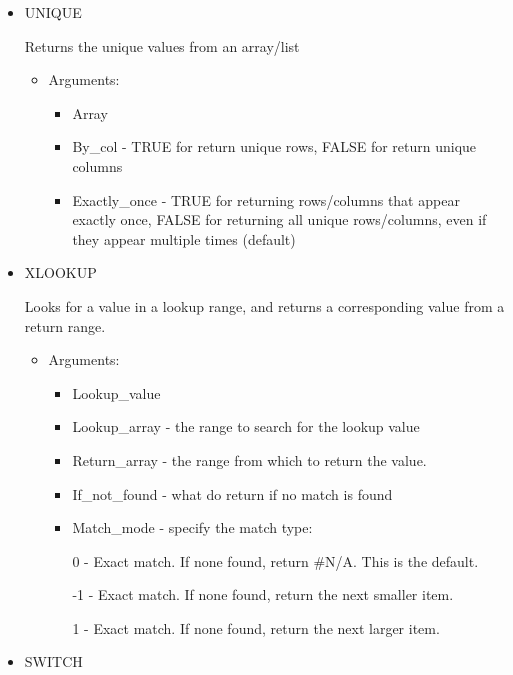 \documentclass[8pt]{extarticle}
\begin{document}
\begin{multicols}{3}
\begin{itemize}
    \item UNIQUE
    
    Returns the unique values from an array/list
    \begin{itemize}
        \item Arguments:
        \begin{itemize}
            \item Array
            \item By\_col - TRUE for return unique rows, FALSE for return unique columns
            \item Exactly\_once - TRUE for returning rows/columns that appear exactly once, FALSE for returning all unique rows/columns, even if they appear multiple times (default)
        \end{itemize}
    \end{itemize}
\end{itemize}

\columnbreak
\begin{itemize}
    \item XLOOKUP
    
    Looks for a value in a lookup range, and returns a corresponding value from a return range.
    \begin{itemize}
        \item Arguments:
        \begin{itemize}
            \item Lookup\_value
            \item Lookup\_array - the range to search for the lookup value
            \item Return\_array - the range from which to return the value.
            \item If\_not\_found - what do return if no match is found
            \item Match\_mode - specify the match type:
            
            0 - Exact match. If none found, return \#N/A. This is the default.
            
            -1 - Exact match. If none found, return the next smaller item.
            
            1 - Exact match. If none found, return the next larger item.
        \end{itemize}
    \end{itemize}
\end{itemize}

\begin{itemize}
    \item SWITCH
    

\end{itemize}
\end{multicols}
\end{document}
